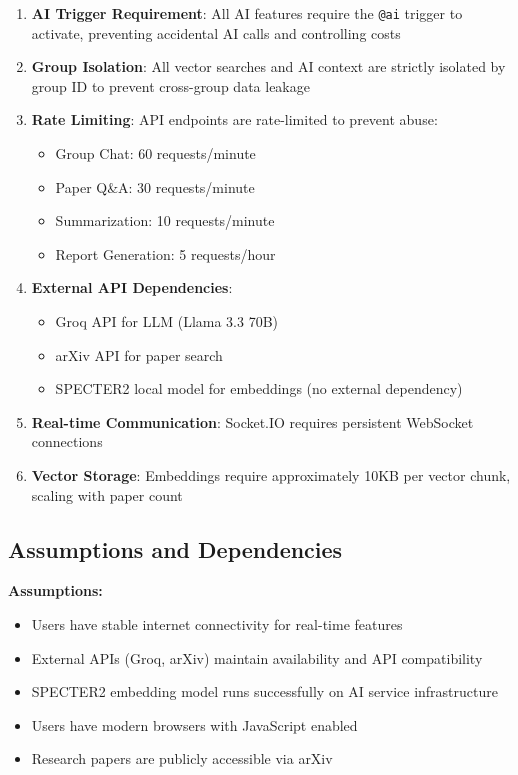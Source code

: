 \documentclass[11pt,a4paper]{article}
\begin{document}
\begin{enumerate}
    \item \textbf{AI Trigger Requirement}: All AI features require the \texttt{@ai} trigger to activate, preventing accidental AI calls and controlling costs

    \item \textbf{Group Isolation}: All vector searches and AI context are strictly isolated by group ID to prevent cross-group data leakage

    \item \textbf{Rate Limiting}: API endpoints are rate-limited to prevent abuse:
    \begin{itemize}
        \item Group Chat: 60 requests/minute
        \item Paper Q\&A: 30 requests/minute
        \item Summarization: 10 requests/minute
        \item Report Generation: 5 requests/hour
    \end{itemize}

    \item \textbf{External API Dependencies}:
    \begin{itemize}
        \item Groq API for LLM (Llama 3.3 70B)
        \item arXiv API for paper search
        \item SPECTER2 local model for embeddings (no external dependency)
    \end{itemize}

    \item \textbf{Real-time Communication}: Socket.IO requires persistent WebSocket connections

    \item \textbf{Vector Storage}: Embeddings require approximately 10KB per vector chunk, scaling with paper count
\end{enumerate}

\subsection{Assumptions and Dependencies}

\textbf{Assumptions:}
\begin{itemize}
    \item Users have stable internet connectivity for real-time features
    \item External APIs (Groq, arXiv) maintain availability and API compatibility
    \item SPECTER2 embedding model runs successfully on AI service infrastructure
    \item Users have modern browsers with JavaScript enabled
    \item Research papers are publicly accessible via arXiv
\end{itemize}
\end{document}
